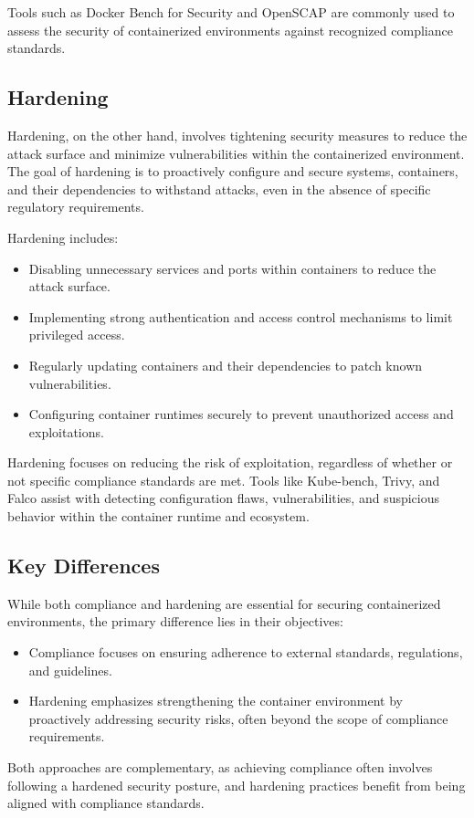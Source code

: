 \documentclass[12pt,a4paper]{report}
\begin{document}
Tools such as Docker Bench for Security and OpenSCAP are commonly used to assess the security of containerized environments against recognized compliance standards.

\subsection{Hardening}

Hardening, on the other hand, involves tightening security measures to reduce the attack surface and minimize vulnerabilities within the containerized environment. The goal of hardening is to proactively configure and secure systems, containers, and their dependencies to withstand attacks, even in the absence of specific regulatory requirements.

Hardening includes:
\begin{itemize}
    \item Disabling unnecessary services and ports within containers to reduce the attack surface.
    \item Implementing strong authentication and access control mechanisms to limit privileged access.
    \item Regularly updating containers and their dependencies to patch known vulnerabilities.
    \item Configuring container runtimes securely to prevent unauthorized access and exploitations.
\end{itemize}

Hardening focuses on reducing the risk of exploitation, regardless of whether or not specific compliance standards are met. Tools like Kube-bench, Trivy, and Falco assist with detecting configuration flaws, vulnerabilities, and suspicious behavior within the container runtime and ecosystem.

\subsection{Key Differences}

While both compliance and hardening are essential for securing containerized environments, the primary difference lies in their objectives:
\begin{itemize}
    \item Compliance focuses on ensuring adherence to external standards, regulations, and guidelines.
    \item Hardening emphasizes strengthening the container environment by proactively addressing security risks, often beyond the scope of compliance requirements.
\end{itemize}
Both approaches are complementary, as achieving compliance often involves following a hardened security posture, and hardening practices benefit from being aligned with compliance standards.
\end{document}
